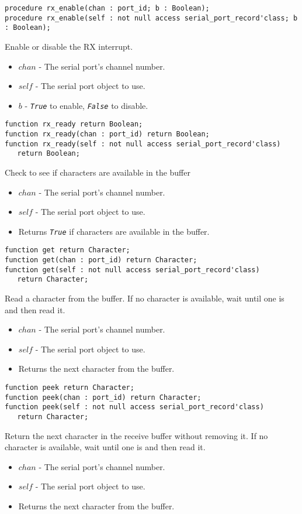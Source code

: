 \documentclass[10pt, openany]{book}
\newcommand{\indexfunc}[1]{\index[func]{#1}}
\newcommand{\constant}[1]{\emph{\texttt{#1}}}
\begin{document}
\begin{lstlisting}
procedure rx_enable(chan : port_id; b : Boolean);
procedure rx_enable(self : not null access serial_port_record'class; b : Boolean);
\end{lstlisting}
\indexfunc{rx\_enable}
Enable or disable the RX interrupt.
\begin{itemize}
  \item $chan$ - The serial port's channel number.
  \item $self$ - The serial port object to use.
  \item $b$ - \constant{True} to enable, \constant{False} to disable.
\end{itemize}

\begin{lstlisting}
function rx_ready return Boolean;
function rx_ready(chan : port_id) return Boolean;
function rx_ready(self : not null access serial_port_record'class)
   return Boolean;
\end{lstlisting}
\indexfunc{rx\_ready}
Check to see if characters are available in the buffer
\begin{itemize}
  \item $chan$ - The serial port's channel number.
  \item $self$ - The serial port object to use.
  \item Returns \constant{True} if characters are available in the buffer.
\end{itemize}

\begin{lstlisting}
function get return Character;
function get(chan : port_id) return Character;
function get(self : not null access serial_port_record'class)
   return Character;
\end{lstlisting}
\indexfunc{get}
Read a character from the buffer.  If no character is available, wait until one is and then read it.
\begin{itemize}
  \item $chan$ - The serial port's channel number.
  \item $self$ - The serial port object to use.
  \item Returns the next character from the buffer.
\end{itemize}

\begin{lstlisting}
function peek return Character;
function peek(chan : port_id) return Character;
function peek(self : not null access serial_port_record'class)
   return Character;
\end{lstlisting}
\indexfunc{peek}
Return the next character in the receive buffer without removing it.  If no character is available, wait until one is and then read it.
\begin{itemize}
  \item $chan$ - The serial port's channel number.
  \item $self$ - The serial port object to use.
  \item Returns the next character from the buffer.
\end{itemize}
\end{document}
